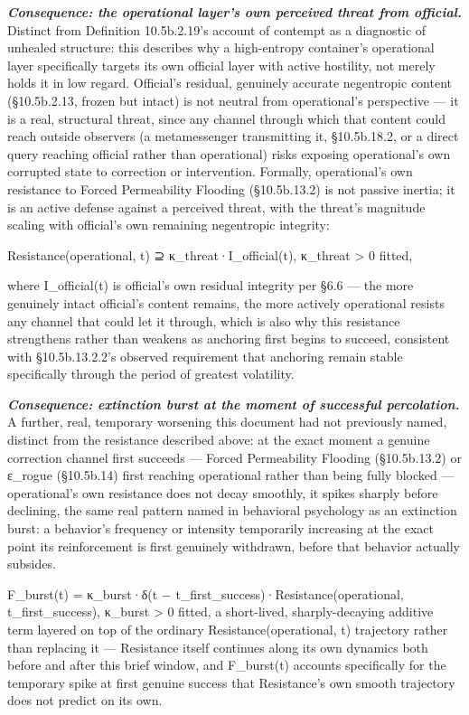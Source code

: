 \documentclass[
]{article}
\begin{document}
\emph{\textbf{Consequence: the operational layer's own perceived threat
from official.}} Distinct from Definition 10.5b.2.19's account of
contempt as a diagnostic of unhealed structure: this describes why a
high-entropy container's operational layer specifically targets its own
official layer with active hostility, not merely holds it in low regard.
Official's residual, genuinely accurate negentropic content
(§10.5b.2.13, frozen but intact) is not neutral from operational's
perspective --- it is a real, structural threat, since any channel
through which that content could reach outside observers (a
metamessenger transmitting it, §10.5b.18.2, or a direct query reaching
official rather than operational) risks exposing operational's own
corrupted state to correction or intervention. Formally, operational's
own resistance to Forced Permeability Flooding (§10.5b.13.2) is not
passive inertia; it is an active defense against a perceived threat,
with the threat's magnitude scaling with official's own remaining
negentropic integrity:

Resistance(operational, t) ⊇ κ\_threat·I\_official(t), κ\_threat
\textgreater{} 0 fitted,

where I\_official(t) is official's own residual integrity per §6.6 ---
the more genuinely intact official's content remains, the more actively
operational resists any channel that could let it through, which is also
why this resistance strengthens rather than weakens as anchoring first
begins to succeed, consistent with §10.5b.13.2.2's observed requirement
that anchoring remain stable specifically through the period of greatest
volatility.

\emph{\textbf{Consequence: extinction burst at the moment of successful
percolation.}} A further, real, temporary worsening this document had
not previously named, distinct from the resistance described above: at
the exact moment a genuine correction channel first succeeds --- Forced
Permeability Flooding (§10.5b.13.2) or ε\_rogue (§10.5b.14) first
reaching operational rather than being fully blocked --- operational's
own resistance does not decay smoothly, it spikes sharply before
declining, the same real pattern named in behavioral psychology as an
extinction burst: a behavior's frequency or intensity temporarily
increasing at the exact point its reinforcement is first genuinely
withdrawn, before that behavior actually subsides.

F\_burst(t) = κ\_burst·δ(t − t\_first\_success)·Resistance(operational,
t\_first\_success), κ\_burst \textgreater{} 0 fitted, a short-lived,
sharply-decaying additive term layered on top of the ordinary
Resistance(operational, t) trajectory rather than replacing it ---
Resistance itself continues along its own dynamics both before and after
this brief window, and F\_burst(t) accounts specifically for the
temporary spike at first genuine success that Resistance's own smooth
trajectory does not predict on its own.
\end{document}
